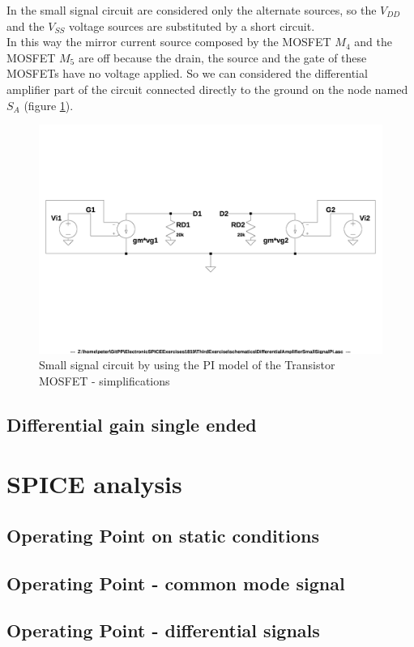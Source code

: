\documentclass[10pt,a4paper]{book}
\begin{document}
In the small signal circuit are considered only the alternate sources, so the $V_{DD}$ and the $V_{SS}$ voltage sources are substituted by a short circuit.\\
In this way the mirror current source composed by the MOSFET $M_4$ and the MOSFET $M_5$ are off because the drain, the source and the gate of these MOSFETs have no voltage applied. So we can considered the differential amplifier part of the circuit connected directly to the ground on the node named $S_A$ (figure \ref{PiSimple}).\par
\begin{figure}[h]
  \centering
  \includegraphics[width=12cm]{schematics/DifferentialAmplifierSmallSignalPi.jpg}
  \caption{Small signal circuit by using the PI model of the Transistor MOSFET - simplifications}
  \label{PiSimple}
\end{figure} 

\subsection{Differential gain single ended}


\clearpage
\section{SPICE analysis}
\subsection{Operating Point on static conditions}



\subsection{Operating Point - common mode signal}



\subsection{Operating Point - differential signals}


\end{document}
